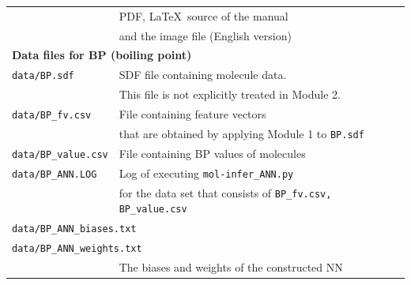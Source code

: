 \documentclass[11pt, titlepage, dvipdfmx, twoside]{article}
\begin{document}
\begin{table}[h!]
\begin{tabular}{lcll}
  &&\multicolumn{2}{l}{PDF, \LaTeX\   source of the manual}\\
  &&\multicolumn{2}{l}{and the image file (English version)}\\
  \hline
  \multicolumn{4}{l}{\bf Data files for BP (boiling point)~\cite{pubchem}}\\
  \multicolumn{2}{l}{\tt data/BP.sdf} & \multicolumn{2}{l}{SDF file containing molecule data.}\\
  \multicolumn{2}{l}{\tt } & \multicolumn{2}{l}{This file is not explicitly treated in Module 2.}\\
  \multicolumn{2}{l}{\tt data/BP\_fv.csv} & \multicolumn{2}{l}{File containing feature vectors}\\
  \multicolumn{2}{l}{\tt } & \multicolumn{2}{l}{that are obtained by applying Module 1 to {\tt BP.sdf}}\\
  \multicolumn{2}{l}{\tt data/BP\_value.csv} & \multicolumn{2}{l}{File containing BP values of molecules}\\
  \multicolumn{2}{l}{\tt data/BP\_ANN.LOG} & \multicolumn{2}{l}{Log of executing {\tt mol-infer\_ANN.py}}\\
  \multicolumn{2}{l}{\tt } & \multicolumn{2}{l}{for the data set that consists of {\tt BP\_fv.csv, BP\_value.csv}}\\
  \multicolumn{4}{l}{\tt data/BP\_ANN\_biases.txt} \\
  \multicolumn{4}{l}{\tt data/BP\_ANN\_weights.txt} \\
  &&\multicolumn{2}{l}{The biases and weights of the constructed NN}\\
  \hline
  \end{tabular}
\end{table}

\newpage
\end{document}
